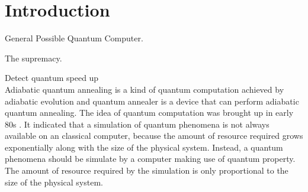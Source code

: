 \documentclass[twoside,a4paper,article]{combine}
\begin{document}


\begin{abstract}
\end{abstract}

\tableofcontents
\newpage


\section{Introduction}
\cite{Ladd2010} General Possible Quantum Computer. 

\cite{Boixo2016} The supremacy.

\cite{Ronnow2014} Detect quantum speed up\\

Adiabatic quantum annealing is a kind of quantum computation achieved by adiabatic evolution and quantum annealer is a device that can perform adiabatic quantum annealing. The idea of quantum computation was brought up in early 80s \cite{Feynman1982}. It indicated that a simulation of quantum phenomena is not always available on an classical computer, because the amount of resource required grows exponentially along with the size of the physical system. Instead, a quantum phenomena should be simulate by a computer making use of quantum property. The amount of resource required by the simulation is only proportional to the size of the physical system. \\
\end{document}
